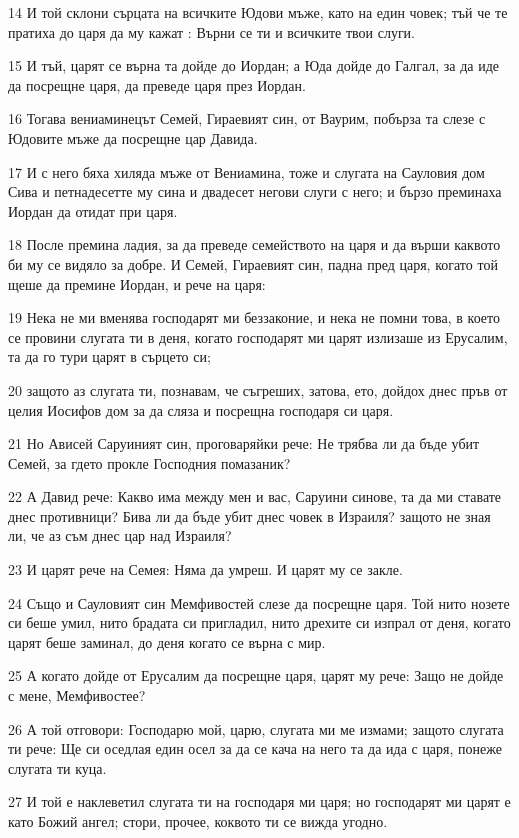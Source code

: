 \par 14 И той склони сърцата на всичките Юдови мъже, като на един човек; тъй че те пратиха до царя да му кажат : Върни се ти и всичките твои слуги.
\par 15 И тъй, царят се върна та дойде до Иордан; а Юда дойде до Галгал, за да иде да посрещне царя, да преведе царя през Иордан.
\par 16 Тогава вениаминецът Семей, Гираевият син, от Ваурим, побърза та слезе с Юдовите мъже да посрещне цар Давида.
\par 17 И с него бяха хиляда мъже от Вениамина, тоже и слугата на Сауловия дом Сива и петнадесетте му сина и двадесет негови слуги с него; и бързо преминаха Иордан да отидат при царя.
\par 18 После премина ладия, за да преведе семейството на царя и да върши каквото би му се видяло за добре. И Семей, Гираевият син, падна пред царя, когато той щеше да премине Иордан, и рече на царя:
\par 19 Нека не ми вменява господарят ми беззаконие, и нека не помни това, в което се провини слугата ти в деня, когато господарят ми царят излизаше из Ерусалим, та да го тури царят в сърцето си;
\par 20 защото аз слугата ти, познавам, че съгреших, затова, ето, дойдох днес пръв от целия Иосифов дом за да сляза и посрещна господаря си царя.
\par 21 Но Ависей Саруиният син, проговаряйки рече: Не трябва ли да бъде убит Семей, за гдето прокле Господния помазаник?
\par 22 А Давид рече: Какво има между мен и вас, Саруини синове, та да ми ставате днес противници? Бива ли да бъде убит днес човек в Израиля? защото не зная ли, че аз съм днес цар над Израиля?
\par 23 И царят рече на Семея: Няма да умреш. И царят му се закле.
\par 24 Също и Сауловият син Мемфивостей слезе да посрещне царя. Той нито нозете си беше умил, нито брадата си пригладил, нито дрехите си изпрал от деня, когато царят беше заминал, до деня когато се върна с мир.
\par 25 А когато дойде от Ерусалим да посрещне царя, царят му рече: Защо не дойде с мене, Мемфивостее?
\par 26 А той отговори: Господарю мой, царю, слугата ми ме измами; защото слугата ти рече: Ще си оседлая един осел за да се кача на него та да ида с царя, понеже слугата ти куца.
\par 27 И той е наклеветил слугата ти на господаря ми царя; но господарят ми царят е като Божий ангел; стори, прочее, коквото ти се вижда угодно.
